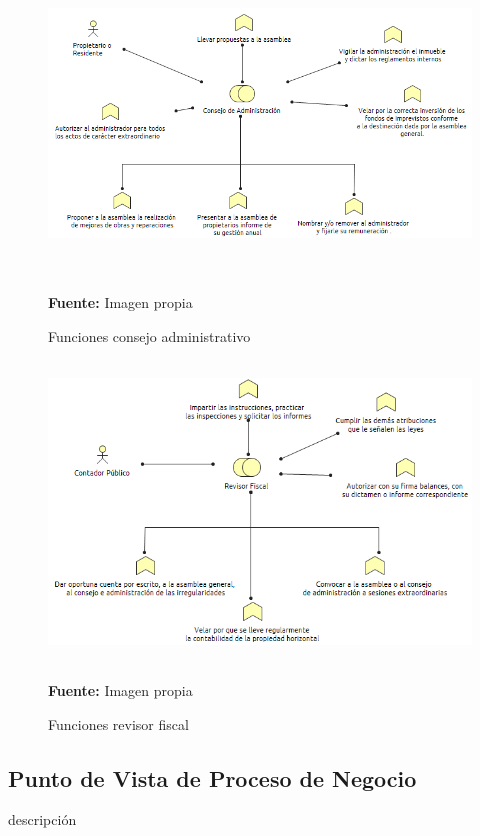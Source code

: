 \begin{figure}[th!]
	\centering
	\includegraphics[width=13cm,height=8cm]{arquitectura/negocio/imgs/funciones-2}
	\caption{Funciones consejo administrativo}{\scriptsize \textbf{Fuente:} Imagen propia}
\end{figure}
\begin{figure}[th!]
	\centering
	\includegraphics[width=13cm,height=8cm]{arquitectura/negocio/imgs/funciones-3}
	\caption{Funciones revisor fiscal}{\scriptsize \textbf{Fuente:} Imagen propia}
\end{figure}
\newpage

\subsection{Punto de Vista de Proceso de Negocio}
descripción


